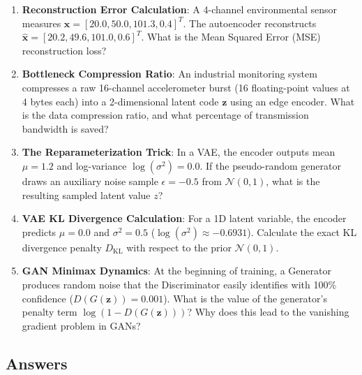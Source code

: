 \begin{checkyourself}
\begin{enumerate}
    \item \textbf{Reconstruction Error Calculation}: A 4-channel environmental sensor measures $\mathbf{x} = [20.0, 50.0, 101.3, 0.4]^T$. The autoencoder reconstructs $\hat{\mathbf{x}} = [20.2, 49.6, 101.0, 0.6]^T$. What is the Mean Squared Error (MSE) reconstruction loss?
    \item \textbf{Bottleneck Compression Ratio}: An industrial monitoring system compresses a raw 16-channel accelerometer burst (16 floating-point values at 4 bytes each) into a 2-dimensional latent code $\mathbf{z}$ using an edge encoder. What is the data compression ratio, and what percentage of transmission bandwidth is saved?
    \item \textbf{The Reparameterization Trick}: In a VAE, the encoder outputs mean $\mu = 1.2$ and log-variance $\log(\sigma^2) = 0.0$. If the pseudo-random generator draws an auxiliary noise sample $\epsilon = -0.5$ from $\mathcal{N}(0, 1)$, what is the resulting sampled latent value $z$?
    \item \textbf{VAE KL Divergence Calculation}: For a 1D latent variable, the encoder predicts $\mu = 0.0$ and $\sigma^2 = 0.5$ ($\log(\sigma^2) \approx -0.6931$). Calculate the exact KL divergence penalty $D_{\text{KL}}$ with respect to the prior $\mathcal{N}(0, 1)$.
    \item \textbf{GAN Minimax Dynamics}: At the beginning of training, a Generator produces random noise that the Discriminator easily identifies with 100\% confidence ($D(G(\mathbf{z})) = 0.001$). What is the value of the generator's penalty term $\log(1 - D(G(\mathbf{z})))$? Why does this lead to the vanishing gradient problem in GANs?
\end{enumerate}
\end{checkyourself}

\subsection*{Answers}\label{subsec:answers}

